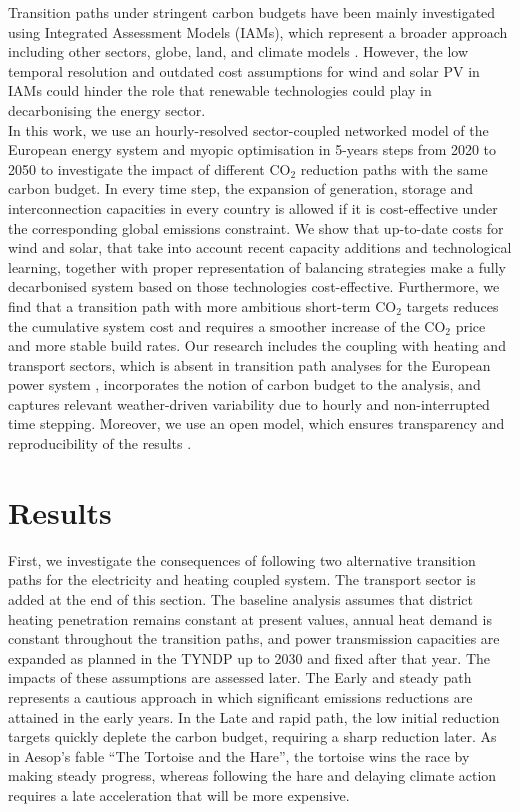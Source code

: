 \documentclass[5p]{elsarticle} %
\begin{document}
Transition paths under stringent carbon budgets have been mainly investigated using Integrated Assessment Models (IAMs), which represent a broader approach including other sectors, globe, land, and climate models \cite{Creutzig_2017, Rogelj_2018, Vanvuuren_2018, Grubler_2018}. However, the low temporal resolution and outdated cost assumptions for wind and solar PV \cite{Creutzig_2017, Krey_2019} in IAMs could hinder the role that renewable technologies could play in decarbonising the energy sector. \\

In this work, we use an hourly-resolved sector-coupled networked model of the European energy system and myopic optimisation in 5-years steps from 2020 to 2050 to investigate the impact of different CO$_2$ reduction paths with the same carbon budget. In every time step, the expansion of generation, storage and interconnection capacities in every country is allowed if it is cost-effective under the corresponding global emissions constraint. We show that up-to-date costs for wind and solar, that take into account recent capacity additions and technological learning, together with proper representation of balancing strategies make a fully decarbonised system based on those technologies cost-effective. Furthermore, we find that a transition path with more ambitious short-term CO$_2$ targets reduces the cumulative system cost and requires a smoother increase of the CO$_2$ price and more stable build rates. Our research includes the coupling  with heating and transport sectors, which is absent in transition path analyses for the European power system \cite{Plesmann_2017, Gerbaulet_2019, Poncelet_2016}, incorporates the notion of carbon budget to the analysis, and captures relevant weather-driven variability due to hourly and non-interrupted time stepping.  Moreover, we use an open model, which ensures transparency and reproducibility of the results \cite{Pfenninger_2017}. %

\section{Results}

First, we investigate the consequences of following two alternative transition paths for the electricity and heating coupled system. The transport sector is added at the end of this section. The baseline analysis assumes that district heating penetration remains constant at present values, annual heat demand is constant throughout the transition paths, and power transmission capacities are expanded as planned in the TYNDP \cite{TYNDP_scenarios} up to 2030 and fixed after that year. The impacts of these assumptions are assessed later. The Early and steady path represents a cautious approach in which significant emissions reductions are attained in the early years. In the Late and rapid path, the low initial reduction targets quickly deplete the carbon budget, requiring a sharp reduction later. As in Aesop's fable ``The Tortoise and the Hare'', the tortoise wins the race by making steady progress, whereas following the hare and delaying climate action requires a late acceleration that will be more expensive. 
\end{document}
